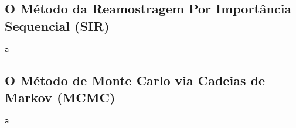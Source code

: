 \documentclass[12pt,reqno,a4paper,oneside]{article}
\begin{document}
\subsection*{O Método da Reamostragem Por Importância Sequencial (SIR)}

\begin{verbatim}
a
\end{verbatim}

\subsection*{O Método de Monte Carlo via Cadeias de Markov (MCMC)}

\begin{verbatim}
a
\end{verbatim}
\end{document}
